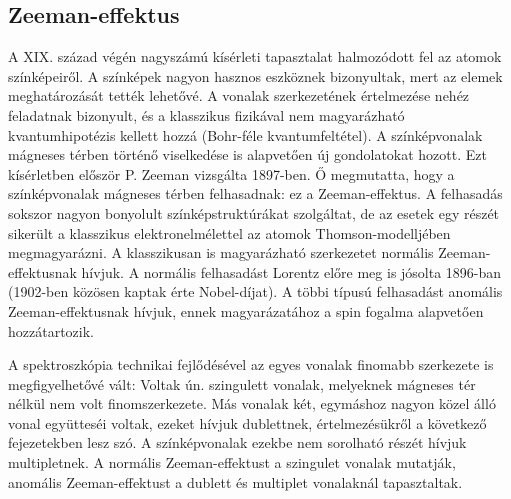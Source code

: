 \documentclass[../main.tex]{subfiles}
\begin{document}
\subsection{Zeeman-effektus}
A XIX. század végén nagyszámú kísérleti tapasztalat halmozódott fel az
atomok színképeiről.
A színképek nagyon hasznos eszköznek bizonyultak, mert az elemek
meghatározását tették lehetővé.
A vonalak szerkezetének értelmezése nehéz feladatnak bizonyult, és a
klasszikus fizikával nem magyarázható kvantumhipotézis kellett hozzá
(Bohr-féle kvantumfeltétel).
A színképvonalak mágneses térben történő viselkedése is alapvetően új
gondolatokat hozott.
Ezt kísérletben először P. Zeeman vizsgálta 1897-ben.
Ő megmutatta, hogy a színképvonalak mágneses térben felhasadnak: ez a
Zeeman-effektus.
A felhasadás sokszor nagyon bonyolult színképstruktúrákat szolgáltat,
de az esetek egy részét sikerült a klasszikus elektronelmélettel az
atomok Thomson-modelljében megmagyarázni.
A klasszikusan is magyarázható szerkezetet normális Zeeman-effektusnak
hívjuk.
A normális felhasadást Lorentz előre meg is jósolta 1896-ban
(1902-ben közösen kaptak érte Nobel-díjat).
A többi típusú felhasadást anomális Zeeman-effektusnak hívjuk, ennek
magyarázatához a spin fogalma alapvetően hozzátartozik.

A spektroszkópia technikai fejlődésével az egyes vonalak finomabb
szerkezete is megfigyelhetővé vált: Voltak ún. szingulett vonalak,
melyeknek mágneses tér nélkül nem volt finomszerkezete.
Más vonalak két, egymáshoz nagyon közel álló vonal együtteséi voltak,
ezeket hívjuk dublettnek, értelmezésükről a következő fejezetekben lesz szó.
A színképvonalak ezekbe nem sorolható részét hívjuk multipletnek.
A normális Zeeman-effektust a szingulet vonalak mutatják, anomális
Zeeman-effektust a dublett és multiplet vonalaknál tapasztaltak.
\end{document}
